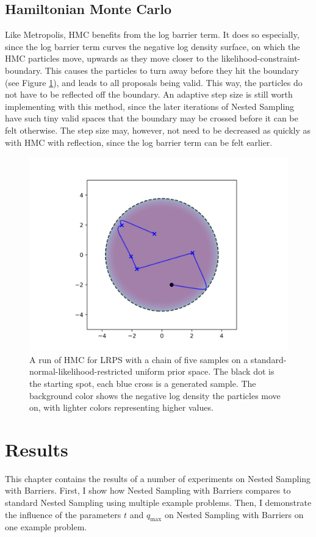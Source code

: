 \documentclass[12pt, a4paper]{report}
\begin{document}
\subsection{Hamiltonian Monte Carlo}
Like Metropolis, HMC benefits from the log barrier term.
It does so especially, since the log barrier term curves the negative log density surface, on which the HMC particles move, upwards as they move closer to the likelihood-constraint-boundary.
This causes the particles to turn away before they hit the boundary (see Figure \ref{fig:barrier_sampling_hmc}), and leads to all proposals being valid.
This way, the particles do not have to be reflected off the boundary.
An adaptive step size is still worth implementing with this method, since the later iterations of Nested Sampling have such tiny valid spaces that the boundary may be crossed before it can be felt otherwise.
The step size may, however, not need to be decreased as quickly as with HMC with reflection, since the log barrier term can be felt earlier.

\begin{figure}
    \centering
    \includegraphics[scale=0.8]{barrier_sampling_hmc.png}
    \caption{A run of HMC for LRPS with a chain of five samples on a standard-normal-likelihood-restricted uniform prior space.
    The black dot is the starting spot, each blue cross is a generated sample.
    The background color shows the negative log density the particles move on, with lighter colors representing higher values.}
    \label{fig:barrier_sampling_hmc}
\end{figure}

\FloatBarrier
\section{Results}
This chapter contains the results of a number of experiments on Nested Sampling with Barriers.
First, I show how Nested Sampling with Barriers compares to standard Nested Sampling using multiple example problems.
Then, I demonstrate the influence of the parameters $t$ and $q_{\textrm{max}}$ on Nested Sampling with Barriers on one example problem.
\end{document}
